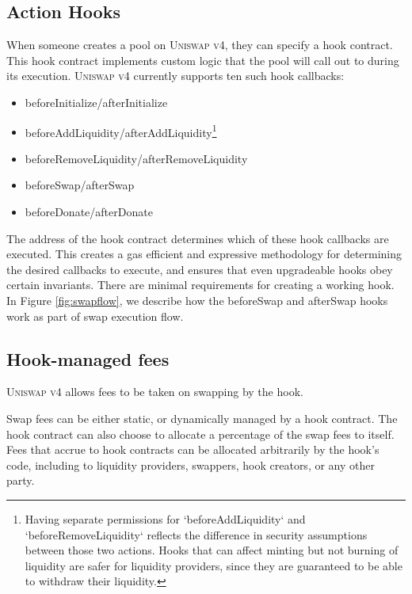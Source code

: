\documentclass[sigconf,nonacm,prologue,table]{acmart}
\numberwithin{equation}{section}
\theoremstyle{definition}
\theoremstyle{remark}
\begin{document}
\subsection{Action Hooks} 
\label{actionhooks}

When someone creates a pool on \textsc{Uniswap v4}, they can specify a hook contract. This hook contract implements custom logic that the pool will call out to during its execution. 
\textsc{Uniswap v4} currently supports ten such hook callbacks:

\begin{itemize}
\item beforeInitialize/afterInitialize
\item beforeAddLiquidity/afterAddLiquidity\footnote{Having separate permissions for `beforeAddLiquidity` and `beforeRemoveLiquidity` reflects the difference in security assumptions between those two actions. Hooks that can affect minting but not burning of liquidity are safer for liquidity providers, since they are guaranteed to be able to withdraw their liquidity.}
\item beforeRemoveLiquidity/afterRemoveLiquidity
\item beforeSwap/afterSwap
\item beforeDonate/afterDonate
\end{itemize}

The address of the hook contract determines which of these hook callbacks are executed. This creates a gas efficient and expressive methodology for determining the desired callbacks to execute, and ensures that even upgradeable hooks obey certain invariants. There are minimal requirements for creating a working hook. In Figure \ref{fig:swapflow}, we describe how the beforeSwap and afterSwap hooks work as part of swap execution flow.


\subsection{Hook-managed fees} \label{hookfees}

\textsc{Uniswap v4} allows fees to be taken on swapping by the hook. 

Swap fees can be either static, or dynamically managed by a hook contract. The hook contract can also choose to allocate a percentage of the swap fees to itself. Fees that accrue to hook contracts can be allocated arbitrarily by the hook’s code, including to liquidity providers, swappers, hook creators, or any other party. 
\end{document}
